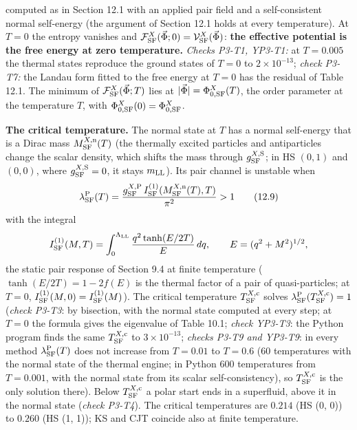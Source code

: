 \documentclass[
  10pt,
]{article}
\begin{document}
computed as in Section 12.1 with an applied pair field and a
self-consistent normal self-energy (the argument of Section 12.1 holds
at every temperature). At \(T=0\) the entropy vanishes and
\(\mathcal F^X_{\rm SF}(\vec\Phi;0)=\mathcal V^X_{\rm SF}(\vec\Phi)\):
\textbf{the effective potential is the free energy at zero temperature.}
\emph{Checks P3-T1, YP3-T1:} at \(T=0.005\) the thermal states reproduce
the ground states of \(T=0\) to \(2\times10^{-13}\); \emph{check P3-T7:}
the Landau form fitted to the free energy at \(T=0\) has the residual of
Table 12.1. The minimum of \(\mathcal F^X_{\rm SF}(\vec\Phi;T)\) lies at
\(\lvert\vec\Phi\rvert=\Phi^X_{0,{\rm SF}}(T)\), the order parameter at
the temperature \(T\), with
\(\Phi^X_{0,{\rm SF}}(0)=\Phi^X_{0,{\rm SF}}\).

\textbf{The critical temperature.} The normal state at \(T\) has a
normal self-energy that is a Dirac mass \(M^{X,{\rm n}}_{\rm SF}(T)\)
(the thermally excited particles and antiparticles change the scalar
density, which shifts the mass through \(g^{X,{\rm S}}_{\rm SF}\); in HS
\((0,1)\) and \((0,0)\), where \(g^{X,{\rm S}}_{\rm SF}=0\), it stays
\(m_{\rm LL}\)). Its pair channel is unstable when
\[\lambda^{\rm P}_{\rm SF}(T)=\frac{g^{X,{\rm P}}_{\rm SF}\,I^{(1)}_{\rm SF}(M^{X,{\rm n}}_{\rm SF}(T),T)}{\pi^2}>1\tag{12.9}\]
with the integral
\[I^{(1)}_{\rm SF}(M,T)=\int_0^{\Lambda_{\rm LL}}\frac{q^2\tanh(E/2T)}{E}\,dq,\qquad E=(q^2+M^2)^{1/2},\]
the static pair response of Section 9.4 at finite temperature
(\(\tanh(E/2T)=1-2f(E)\) is the thermal factor of a pair of
quasi-particles; at \(T=0\),
\(I^{(1)}_{\rm SF}(M,0)=I^{(1)}_{\rm SF}(M)\)). The critical temperature
\(T^{X,{\rm c}}_{\rm SF}\) solves
\(\lambda^{\rm P}_{\rm SF}(T^{X,{\rm c}}_{\rm SF})=1\) (\emph{check
P3-T3}: by bisection, with the normal state computed at every step; at
\(T=0\) the formula gives the eigenvalue of Table 10.1; \emph{check
YP3-T3}: the Python program finds the same \(T^{X,{\rm c}}_{\rm SF}\) to
\(3\times10^{-13}\); \emph{checks P3-T9 and YP3-T9}: in every method
\(\lambda^{\rm P}_{\rm SF}(T)\) does not increase from \(T=0.01\) to
\(T=0.6\) (60 temperatures with the normal state of the thermal engine;
in Python 600 temperatures from \(T=0.001\), with the normal state from
its scalar self-consistency), so \(T^{X,{\rm c}}_{\rm SF}\) is the only
solution there). Below \(T^{X,{\rm c}}_{\rm SF}\) a polar start ends in
a superfluid, above it in the normal state (\emph{check P3-T4}). The
critical temperatures are \(0.214\) (HS (0, 0)) to \(0.260\) (HS (1,
1)); KS and CJT coincide also at finite temperature.
\end{document}
